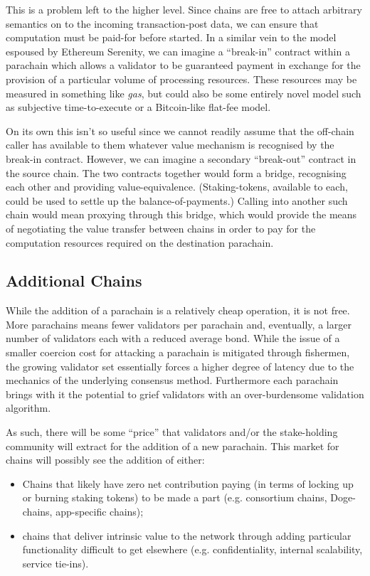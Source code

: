 \documentclass[9pt,oneside]{amsart}
\makeatletter
\newcommand*\eg{e.g.\@\xspace}
\makeatother
\begin{document}
\begin{multicols}{2}
This is a problem left to the higher level. Since chains are free to attach arbitrary semantics on to the incoming transaction-post data, we can ensure that computation must be paid-for before started. In a similar vein to the model espoused by Ethereum Serenity, we can imagine a ``break-in'' contract within a parachain which allows a validator to be guaranteed payment in exchange for the provision of a particular volume of processing resources. These resources may be measured in something like \textit{gas}, but could also be some entirely novel model such as subjective time-to-execute or a Bitcoin-like flat-fee model.

 On its own this isn't so useful since we cannot readily assume that the off-chain caller has available to them whatever value mechanism is recognised by the break-in contract. However, we can imagine a secondary ``break-out'' contract in the source chain. The two contracts together would form a bridge, recognising each other and providing value-equivalence. (Staking-tokens, available to each, could be used to settle up the balance-of-payments.) Calling into another such chain would mean proxying through this bridge, which would provide the means of negotiating the value transfer between chains in order to pay for the computation resources required on the destination parachain.

\subsection{Additional Chains}
\label{additional-chains}

 While the addition of a parachain is a relatively cheap operation, it is not free. More parachains means fewer validators per parachain and, eventually, a larger number of validators each with a reduced average bond. While the issue of a smaller coercion cost for attacking a parachain is mitigated through fishermen, the growing validator set essentially forces a higher degree of latency due to the mechanics of the underlying consensus method. Furthermore each parachain brings with it the potential to grief validators with an over-burdensome validation algorithm.

 As such, there will be some ``price'' that validators and/or the stake-holding community will extract for the addition of a new parachain. This market for chains will possibly see the addition of either:

\begin{itemize}
\item Chains that likely have zero net contribution paying (in terms of locking up or burning staking tokens) to be made a part (\eg consortium chains, Doge-chains, app-specific chains);
\item chains that deliver intrinsic value to the network through adding particular functionality difficult to get elsewhere (\eg confidentiality, internal scalability, service tie-ins).
\end{itemize}


\end{multicols}
\end{document}
